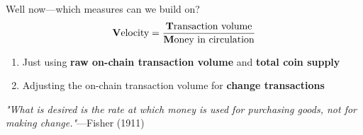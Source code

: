 \begin{frame}{Well now---which measures can we build on?}
	\begin{align*}
		\text{\textbf{V}elocity} = \frac{\text{\textbf{T}ransaction volume}}{\text{\textbf{M}oney in circulation}}
	\end{align*}
	\begin{enumerate}\setlength{\itemsep}{0.5em}
		\item Just using \textbf{raw on-chain transaction volume} and \textbf{total coin supply}\\%
		\item Adjusting the on-chain transaction volume for \textbf{change transactions}\\%
	\end{enumerate}
	\vspace{2em}
	\textit{"What is desired is the rate at which money is used for purchasing goods, not for making change."}---Fisher (1911)
\end{frame}


